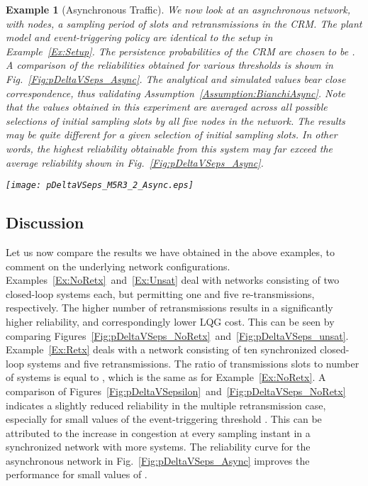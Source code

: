 \documentclass[journal]{IEEEtran}
\newtheorem{example}{Example}[section]
\begin{document}
\begin{example}[Asynchronous Traffic] \label{Ex:Async}
We now look at an asynchronous network, with  nodes, a sampling period of  slots and  retransmissions in the CRM. The plant model and event-triggering policy are identical to the setup in Example~\ref{Ex:Setup}. The persistence probabilities of the CRM are chosen to be . A comparison of the reliabilities obtained for various thresholds is shown in Fig.~\ref{Fig:pDeltaVSeps_Async}. The analytical and simulated values bear close correspondence, thus validating Assumption~\ref{Assumption:BianchiAsync}. Note that the values obtained in this experiment are averaged across all possible selections of initial sampling slots by all five nodes in the network. The results may be quite different for a given selection of initial sampling slots. In other words, the highest reliability obtainable from this system may far exceed the average reliability shown in Fig.~\ref{Fig:pDeltaVSeps_Async}.
\begin{figure*}[tb]
\begin{center}
\texttt{[image: pDeltaVSeps\_M5R3\_2\_Async.eps]}
\caption{A comparison of the analytical and simulated values of the reliability versus the event-triggering threshold, for an asynchronous network. The network consists of  nodes, with sampling periods of  slots and  retransmissions in the CRM. The reliability obtained through analysis and simulations is averaged across all possible selections of initial sampling slots by the  nodes in the network. This plot validates Assumption~\ref{Assumption:BianchiAsync}.} \label{Fig:pDeltaVSeps_Async}
\end{center}
\end{figure*}
\end{example}


\subsection{Discussion}

Let us now compare the results we have obtained in the above examples, to comment on the underlying network configurations. Examples~\ref{Ex:NoRetx}~and~\ref{Ex:Unsat} deal with networks consisting of two closed-loop systems each, but permitting one and five re-transmissions, respectively. The higher number of retransmissions results in a significantly higher reliability, and correspondingly lower LQG cost. This can be seen by comparing Figures~\ref{Fig:pDeltaVSeps_NoRetx}~and~\ref{Fig:pDeltaVSeps_unsat}. Example~\ref{Ex:Retx} deals with a network consisting of ten synchronized closed-loop systems and five retransmissions. The ratio of transmissions slots to number of systems is equal to , which is the same as for Example~\ref{Ex:NoRetx}. A comparison of Figures~\ref{Fig:pDeltaVSepsilon}~and~\ref{Fig:pDeltaVSeps_NoRetx} indicates a slightly reduced reliability in the multiple retransmission case, especially for small values of the event-triggering threshold . This can be attributed to the increase in congestion at every sampling instant in a synchronized network with more systems. The reliability curve for the asynchronous network in Fig.~\ref{Fig:pDeltaVSeps_Async} improves the performance for small values of .
\end{document}
